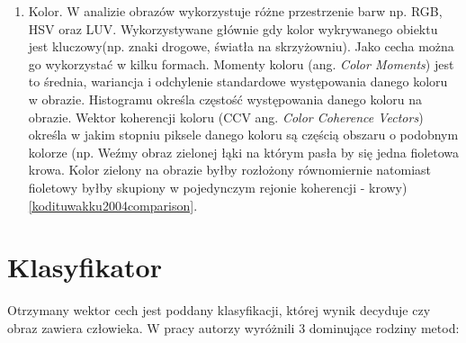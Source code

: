 \begin{enumerate}
\item Kolor. W analizie obrazów wykorzystuje różne przestrzenie barw np. RGB, HSV oraz LUV. Wykorzystywane głównie gdy kolor wykrywanego obiektu jest kluczowy(np. znaki drogowe, światła na skrzyżowniu). Jako cecha można go wykorzystać w kilku formach. Momenty koloru (ang. \textit{Color Moments}) jest to średnia, wariancja i odchylenie standardowe występowania danego koloru w obrazie. Histogramu określa częstość występowania danego koloru na obrazie. Wektor koherencji koloru (CCV ang. \textit{ Color Coherence Vectors}) określa w jakim stopniu piksele danego koloru są częścią obszaru o podobnym kolorze (np. Weźmy obraz zielonej łąki na którym pasła by się jedna fioletowa krowa. Kolor zielony na obrazie byłby rozłożony równomiernie natomiast fioletowy byłby skupiony w pojedynczym rejonie koherencji - krowy) \ref{kodituwakku2004comparison}.

\end{enumerate}

\section{Klasyfikator}
Otrzymany wektor cech jest poddany klasyfikacji, której wynik decyduje czy obraz zawiera człowieka.
W pracy \cite{benenson2014ten} autorzy wyróżnili 3 dominujące rodziny metod:

